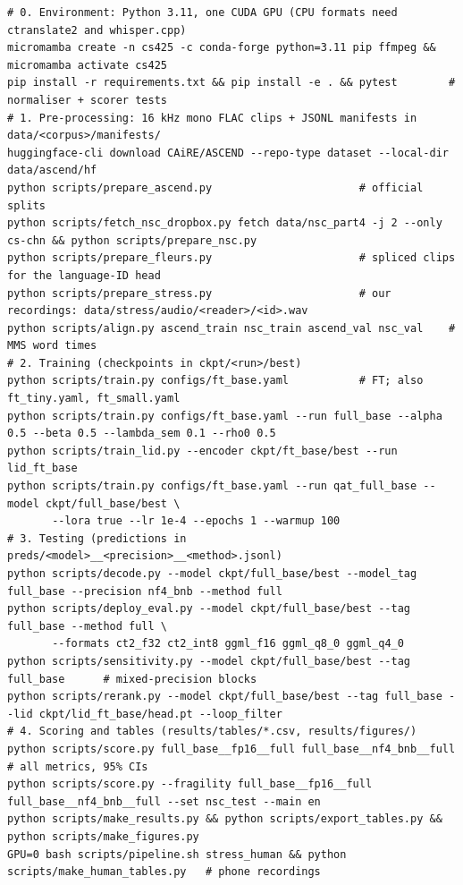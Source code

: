 \begin{table}[t]
\centering
\scriptsize
\begin{verbatim}
# 0. Environment: Python 3.11, one CUDA GPU (CPU formats need ctranslate2 and whisper.cpp)
micromamba create -n cs425 -c conda-forge python=3.11 pip ffmpeg && micromamba activate cs425
pip install -r requirements.txt && pip install -e . && pytest        # normaliser + scorer tests
# 1. Pre-processing: 16 kHz mono FLAC clips + JSONL manifests in data/<corpus>/manifests/
huggingface-cli download CAiRE/ASCEND --repo-type dataset --local-dir data/ascend/hf
python scripts/prepare_ascend.py                       # official splits
python scripts/fetch_nsc_dropbox.py fetch data/nsc_part4 -j 2 --only cs-chn && python scripts/prepare_nsc.py
python scripts/prepare_fleurs.py                       # spliced clips for the language-ID head
python scripts/prepare_stress.py                       # our recordings: data/stress/audio/<reader>/<id>.wav
python scripts/align.py ascend_train nsc_train ascend_val nsc_val    # MMS word times
# 2. Training (checkpoints in ckpt/<run>/best)
python scripts/train.py configs/ft_base.yaml           # FT; also ft_tiny.yaml, ft_small.yaml
python scripts/train.py configs/ft_base.yaml --run full_base --alpha 0.5 --beta 0.5 --lambda_sem 0.1 --rho0 0.5
python scripts/train_lid.py --encoder ckpt/ft_base/best --run lid_ft_base
python scripts/train.py configs/ft_base.yaml --run qat_full_base --model ckpt/full_base/best \
       --lora true --lr 1e-4 --epochs 1 --warmup 100
# 3. Testing (predictions in preds/<model>__<precision>__<method>.jsonl)
python scripts/decode.py --model ckpt/full_base/best --model_tag full_base --precision nf4_bnb --method full
python scripts/deploy_eval.py --model ckpt/full_base/best --tag full_base --method full \
       --formats ct2_f32 ct2_int8 ggml_f16 ggml_q8_0 ggml_q4_0
python scripts/sensitivity.py --model ckpt/full_base/best --tag full_base      # mixed-precision blocks
python scripts/rerank.py --model ckpt/full_base/best --tag full_base --lid ckpt/lid_ft_base/head.pt --loop_filter
# 4. Scoring and tables (results/tables/*.csv, results/figures/)
python scripts/score.py full_base__fp16__full full_base__nf4_bnb__full     # all metrics, 95% CIs
python scripts/score.py --fragility full_base__fp16__full full_base__nf4_bnb__full --set nsc_test --main en
python scripts/make_results.py && python scripts/export_tables.py && python scripts/make_figures.py
GPU=0 bash scripts/pipeline.sh stress_human && python scripts/make_human_tables.py   # phone recordings
\end{verbatim}
\vspace{-1em}
\caption{Commands to pre-process the data, train, test and score (run from the repository root; GPU chosen with \texttt{CUDA\_VISIBLE\_DEVICES}). \texttt{scripts/pipeline.sh <stage>} chains these steps with the settings we used; \texttt{DRY=1} prints the commands.}
\label{tab:commands}
\end{table}

